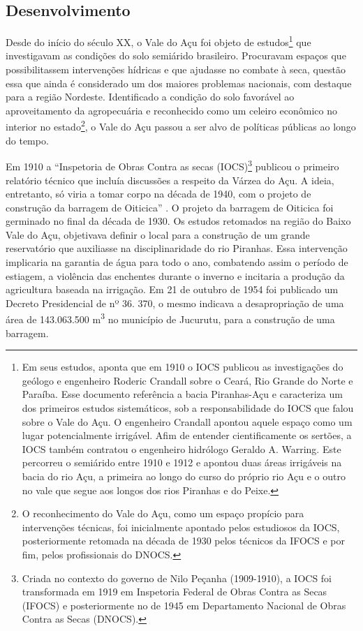 \begin{refsection}
    \section{Desenvolvimento}

    Desde do início do século XX, o Vale do Açu foi objeto de estudos\footnote{Em seus estudos, \textcite{Pinheiro2018Vale} aponta que em 1910 o IOCS publicou as investigações do geólogo e engenheiro Roderic Crandall sobre o Ceará, Rio Grande do Norte e Paraíba. Esse documento referência a bacia Piranhas-Açu e caracteriza um dos primeiros estudos sistemáticos, sob a responsabilidade do IOCS que falou sobre o Vale do Açu. O engenheiro Crandall apontou aquele espaço como um lugar potencialmente irrigável. Afim de entender cientificamente os sertões, a IOCS também contratou o engenheiro hidrólogo Geraldo A. Warring. Este percorreu o semiárido entre 1910 e 1912 e apontou duas áreas irrigáveis na bacia do rio Açu, a primeira ao longo do curso do próprio rio Açu e o outro no vale que segue aos longos dos rios Piranhas e do Peixe. } que investigavam as condições do solo semiárido brasileiro. Procuravam espaços que possibilitassem intervenções hídricas e que ajudasse no combate à seca, questão essa que ainda é considerado um dos maiores problemas nacionais, com destaque para a região Nordeste. Identificado a condição do solo favorável ao aproveitamento da agropecuária e reconhecido como um celeiro econômico no interior no estado\footnote{O reconhecimento do Vale do Açu, como um espaço propício para intervenções técnicas, foi inicialmente apontado pelos estudiosos da IOCS, posteriormente retomada na década de 1930 pelos técnicos da IFOCS e por fim, pelos profissionais do DNOCS.},  o Vale do Açu passou a ser alvo de políticas públicas ao longo do tempo. 

    Em 1910 a ``Inspetoria de Obras Contra as secas (IOCS)\footnote{Criada no contexto do governo de Nilo Peçanha (1909-1910), a IOCS foi transformada em 1919 em Inspetoria Federal de Obras Contra as Secas (IFOCS) e posteriormente no de 1945 em Departamento Nacional de Obras Contra as Secas (DNOCS).} publicou o primeiro relatório técnico que incluía discussões a respeito da Várzea do Açu. A ideia, entretanto, só viria a tomar corpo na década de 1940, com o projeto de construção da barragem de Oiticica'' \cite[p.~15]{Pinheiro2018Vale}. O projeto da barragem de Oiticica foi germinado no final da década de 1930. Os estudos retomados na região do Baixo Vale do Açu, objetivava definir o local para a construção de um grande reservatório que auxiliasse na disciplinaridade do rio Piranhas. Essa intervenção implicaria na garantia de água para todo o ano, combatendo assim o período de estiagem, a violência das enchentes durante o inverno e incitaria a produção da agricultura baseada na irrigação. Em 21 de outubro de 1954 foi publicado um Decreto Presidencial de nº 36. 370, o mesmo indicava a desapropriação de uma área de 143.063.500 m\textsuperscript{3} no município de Jucurutu, para a construção de uma barragem.  


\end{refsection}
